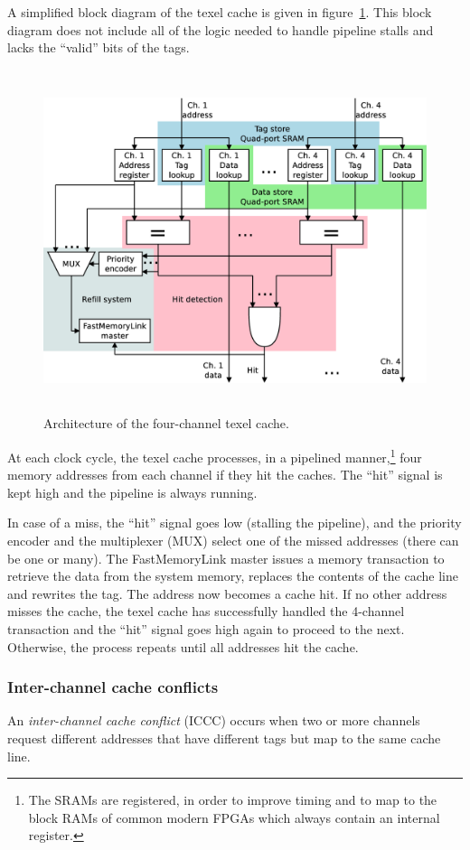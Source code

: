 \documentclass[a4paper,11pt]{kthesis}
\begin{document}
A simplified block diagram of the texel cache is given in figure~\ref{fig:tcarch}. This block diagram does not include all of the logic needed to handle pipeline stalls and lacks the ``valid'' bits of the tags.

\begin{figure}[htp]
\centering
\includegraphics[height=100mm]{tcarch.eps}
\caption{Architecture of the four-channel texel cache.}
\label{fig:tcarch}
\end{figure}

At each clock cycle, the texel cache processes, in a pipelined manner,\footnote{The SRAMs are registered, in order to improve timing and to map to the block RAMs of common modern FPGAs which always contain an internal register.} four memory addresses from each channel if they hit the caches. The ``hit'' signal is kept high and the pipeline is always running.

In case of a miss, the ``hit'' signal goes low (stalling the pipeline), and the priority encoder and the multiplexer (MUX) select one of the missed addresses (there can be one or many). The FastMemoryLink master issues a memory transaction to retrieve the data from the system memory, replaces the contents of the cache line and rewrites the tag. The address now becomes a cache hit. If no other address misses the cache, the texel cache has successfully handled the 4-channel transaction and the ``hit'' signal goes high again to proceed to the next. Otherwise, the process repeats until all addresses hit the cache.

\subsubsection{Inter-channel cache conflicts}
An \textit{inter-channel cache conflict} (ICCC) occurs when two or more channels request different addresses that have different tags but map to the same cache line.
\end{document}
